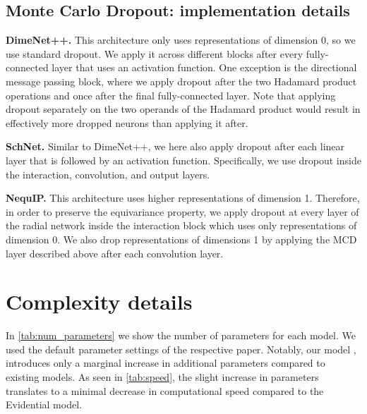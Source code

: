 \begin{table}[h!]
\centering
\caption{Hyperparameters of DimNet++ and SchNet}\label{tab:training_details}

\end{table}


\begin{table}[h!]
\centering
\caption{Hyperparameters of the datasets used with all models}\label{tab:data_hyperparameters}

\end{table}

\subsection{Monte Carlo Dropout: implementation details}
\textbf{DimeNet++.} This architecture only uses representations of dimension 0, so we use standard dropout. We apply it across different blocks after every fully-connected layer that uses an activation function. One exception is the directional message passing block, where we apply dropout after the two Hadamard product operations and once after the final fully-connected layer. Note that applying dropout separately on the two operands of the Hadamard product would result in effectively more dropped neurons than applying it after.

\textbf{SchNet.} Similar to DimeNet++,  we here also apply dropout after each linear layer that is followed by an activation function. Specifically, we use dropout inside the interaction, convolution, and output layers.

\textbf{NequIP.} This architecture uses higher representations of dimension 1. Therefore, in order to preserve the equivariance property, we apply dropout at every layer of the radial network inside the interaction block which uses only representations of dimension 0. We also drop representations of dimensions 1 by applying the MCD layer described above after each convolution layer.

\clearpage
\section{Complexity details}\label{app:complexity}
In \cref{tab:num_parameters} we show the number of parameters for each model. We used the default parameter settings of the respective paper. Notably, our model \oursacro{}, introduces only a marginal increase in additional parameters compared to existing models. As seen in \cref{tab:speed}, the slight increase in parameters translates to a minimal decrease in computational speed compared to the Evidential model.

